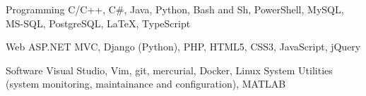 
\begin{cvskills}

\cvskill%
  {Programming} %
  {C/C++, C\#, Java, Python, Bash and Sh, PowerShell, MySQL, MS-SQL, PostgreSQL,
   LaTeX, TypeScript} %

\cvskill%
  {Web} %
  {ASP.NET MVC, Django (Python), PHP, HTML5, CSS3, JavaScript, jQuery} %

\cvskill%
  {Software} %
  {Visual Studio, Vim, git, mercurial, Docker, Linux System Utilities (system
   monitoring, maintainance and configuration), MATLAB} %

\end{cvskills}
